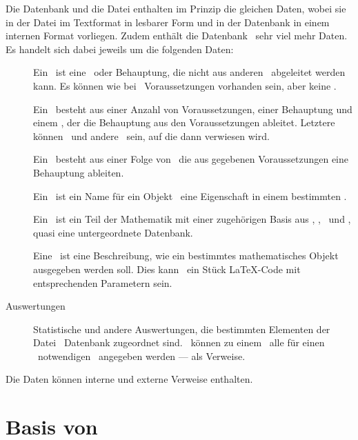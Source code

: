 Die Datenbank und die Datei enthalten im Prinzip die gleichen Daten, wobei sie in der Datei im Textformat in lesbarer Form und in der Datenbank in einem internen Format vorliegen.
Zudem enthält die Datenbank \textiAlg\ sehr viel mehr Daten. Es handelt sich dabei jeweils um die folgenden Daten:
\begin{description}
	\item[\Axiome]          \label{Daten-Axiom}
	Ein \Axiom\ ist eine \Aussage\ oder Behauptung, die nicht aus anderen \Aussagen\ abgeleitet werden kann.
	Es können wie bei \Saetzen\ Voraussetzungen vorhanden sein, aber keine \Beweise.
	\item[\Saetze]          \label{Daten-Satz}
	Ein \Satz\ besteht aus einer Anzahl von Voraussetzungen, einer Behauptung und einem \Beweis, der die Behauptung aus den Voraussetzungen ableitet.
	Letztere können \Axiome\ und andere \Saetze\ sein, auf die dann verwiesen wird.
	\item[\Beweise]         \label{Daten-Beweis}
	Ein \Beweis\ besteht aus einer Folge von \Beweisschritten\, die aus gegebenen Voraussetzungen eine Behauptung ableiten.
	\item[\Fachbegriffe]    \label{Daten-Fachbegriff}
	Ein \Fachbegriff\ ist ein Name für ein Objekt \textbzw\ eine Eigenschaft in einem bestimmten \Fachgebiet.
	\item[\Fachgebiete]     \label{Daten-Fachgebiet}
	Ein \Fachgebiet\ ist ein Teil der Mathematik mit einer zugehörigen Basis aus \Axiomen, \Saetzen, \Fachbegriffen\ und \Ausgabeschemata, quasi eine untergeordnete Datenbank.
	\item[\Ausgabeschemata] \label{Daten-Ausgabeschema}
	Eine \Ausgabeschema\ ist eine Beschreibung, wie ein bestimmtes mathematisches Objekt ausgegeben werden soll.
	Dies kann \textzB\ ein Stück \LaTeX-Code mit entsprechenden Parametern sein.
	\item[Auswertungen]     \label{Daten-Auswertung}
	Statistische und andere Auswertungen, die bestimmten Elementen der Datei \textbzw\ Datenbank zugeordnet sind.
	\textZB\ können zu einem \Satz\ alle für einen \Beweis\ notwendigen \Axiome\ angegeben werden --- als Verweise.
\end{description}
Die Daten können interne und externe Verweise enthalten.

\section[Basis von Beweisen]{Basis von \Beweisen}%
\label                             {sec-BeweisBasis}

